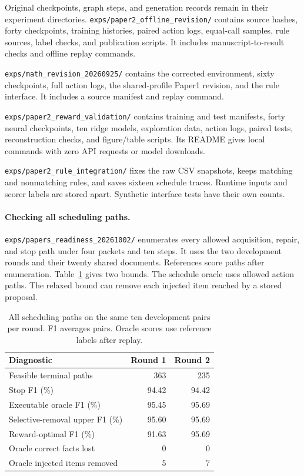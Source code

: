 \label{app:artifact_index}

Original checkpoints, graph steps, and generation records remain in
their experiment directories.
\texttt{exps/paper2\_offline\_revision/} contains source hashes, forty
checkpoints, training histories, paired action logs, equal-call samples,
rule sources, label checks, and publication scripts. It includes
manuscript-to-result checks and offline replay commands.

\texttt{exps/math\_revision\_20260925/} contains the corrected environment,
sixty checkpoints, full action logs, the shared-profile Paper1 revision,
and the rule interface. It includes a source manifest and replay command.

\texttt{exps/paper2\_reward\_validation/} contains training and test
manifests, forty neural checkpoints, ten ridge models, exploration data,
action logs, paired tests, reconstruction checks, and figure/table scripts.
Its README gives local commands with zero API requests or model downloads.

\texttt{exps/paper2\_rule\_integration/} fixes the raw CSV snapshots,
keeps matching and nonmatching rules, and saves sixteen schedule traces.
Runtime inputs and scorer labels are stored apart. Synthetic interface
tests have their own counts.

\paragraph{Checking all scheduling paths.}

\texttt{exps/papers\_readiness\_20261002/} enumerates every allowed
acquisition, repair, and stop path under four packets and ten steps.
It uses the two development rounds and their twenty shared documents.
References score paths after enumeration.
Table~\ref{tab:offline_loop_ceiling} gives two bounds. The schedule oracle
uses allowed action paths. The relaxed bound can remove each injected
item reached by a stored proposal.

\begin{table}[t]
\centering
\caption{All scheduling paths on the same ten development pairs per round. F1 averages pairs. Oracle scores use reference labels after replay.}
\label{tab:offline_loop_ceiling}
\footnotesize
\begin{tabular}{lrr}
\toprule
Diagnostic & Round 1 & Round 2 \\
\midrule
Feasible terminal paths & 363 & 235 \\
Stop F1 (\%) & 94.42 & 94.42 \\
Executable oracle F1 (\%) & 95.45 & 95.69 \\
Selective-removal upper F1 (\%) & 95.60 & 95.69 \\
Reward-optimal F1 (\%) & 91.63 & 95.69 \\
Oracle correct facts lost & 0 & 0 \\
Oracle injected items removed & 5 & 7 \\
\bottomrule
\end{tabular}
\end{table}


